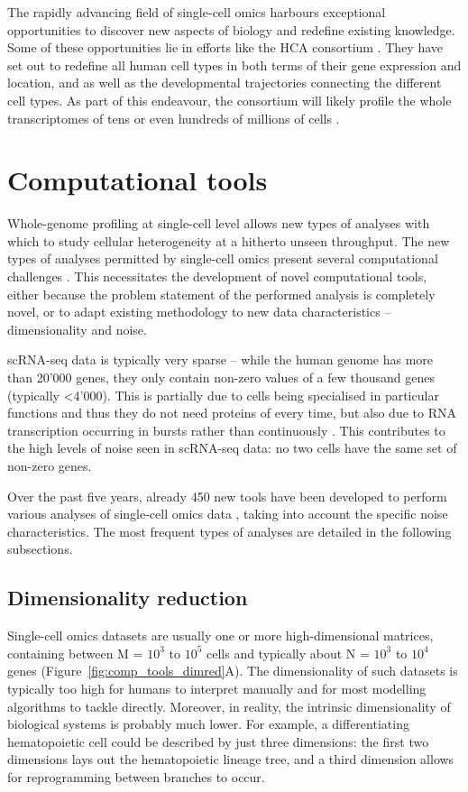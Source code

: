 The rapidly advancing field of single-cell omics harbours exceptional opportunities to discover new aspects of biology and redefine existing knowledge. Some of these opportunities lie in efforts like the HCA consortium \cite{regev_humancellatlas_2018}. They have set out to redefine all human cell types in both terms of their gene expression and location, and as well as the developmental trajectories connecting the different cell types. As part of this endeavour, the consortium will likely profile the whole transcriptomes of tens or even hundreds of millions of cells \cite{humancellatlasconsortium_humancellatlas_2018}. 

\section{Computational tools}
Whole-genome profiling at single-cell level allows new types of analyses with which to study cellular heterogeneity at a hitherto unseen throughput. 
The new types of analyses permitted by single-cell omics present several computational challenges \cite{stegle_computationalanalyticalchallenges_2015, yuan_challengesemergingdirections_2017, chen_singlecellrnaseqtechnologies_2019}. This necessitates the development of novel computational tools, either because the problem statement of the performed analysis is completely novel, or to adapt existing methodology to new data characteristics -- dimensionality and noise. 

scRNA-seq data is typically very sparse -- while the human genome has more than 20'000 genes, they only contain non-zero values of a few thousand genes (typically <4'000). This is partially due to cells being specialised in particular functions and thus they do not need proteins of every time, but also due to RNA transcription occurring in bursts rather than continuously \cite{nicolas_whatshapeseukaryotic_2017}. This contributes to the high levels of noise seen in scRNA-seq data: no two cells have the same set of non-zero genes. 

Over the past five years, already 450 new tools have been developed to perform various analyses of single-cell omics data \cite{zappia_exploringsinglecellrnaseq_2018}, taking into account the specific noise characteristics. The most frequent types of analyses are detailed in the following subsections.

\subsection{Dimensionality reduction}
Single-cell omics datasets are usually one or more high-dimensional matrices, containing between M = $10^3$ to $10^5$ cells and typically about N = $10^3$ to $10^4$ genes (Figure~\ref{fig:comp_tools_dimred}A). The dimensionality of such datasets is typically too high for humans to interpret manually and for most modelling algorithms to tackle directly. 
Moreover, in reality, the intrinsic dimensionality of biological systems is probably much lower. For example, a differentiating hematopoietic cell could be described by just three dimensions: the first two dimensions lays out the hematopoietic lineage tree, and a third dimension allows for reprogramming between branches to occur.

